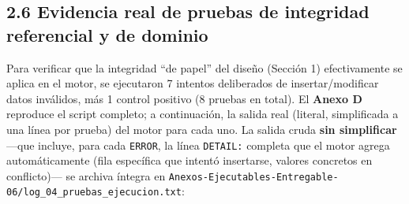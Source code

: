 \documentclass[11pt,a4paper]{article}
\begin{document}
\subsection{2.6 Evidencia real de pruebas de integridad referencial y de dominio}\label{evidencia-real-de-pruebas-de-integridad-referencial-y-de-dominio}

Para verificar que la integridad ``de papel'' del diseño (Sección 1) efectivamente se aplica en el motor, se ejecutaron 7 intentos deliberados de insertar/modificar datos inválidos, más 1 control positivo (8 pruebas en total). El \textbf{Anexo D} reproduce el script completo; a continuación, la salida real (literal, simplificada a una línea por prueba) del motor para cada uno. La salida cruda \textbf{sin simplificar} ---que incluye, para cada \texttt{ERROR}, la línea \texttt{DETAIL:} completa que el motor agrega automáticamente (fila específica que intentó insertarse, valores concretos en conflicto)--- se archiva íntegra en \texttt{Anexos-Ejecutables-Entregable-06/log\_04\_pruebas\_ejecucion.txt}:
\end{document}
